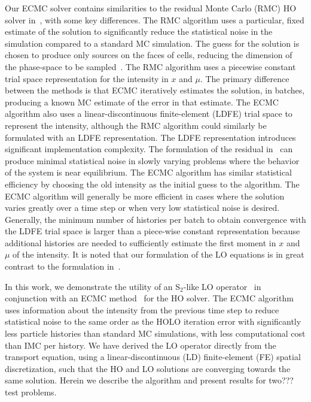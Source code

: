\documentclass{mc2013}
\begin{document}
Our ECMC solver contains similarities to the residual Monte Carlo (RMC) HO solver
in~\cite{rmc}, with some key differences.  The RMC algorithm uses a particular, fixed 
estimate of the solution to significantly reduce the statistical noise in the
simulation compared to a standard MC simulation. The guess for the solution is chosen to produce only sources on the faces of
cells, reducing the dimension of the phase-space to be sampled~\cite{rmc}. The RMC
algorithm  uses a piecewise constant trial space representation for the intensity in
$x$ and $\mu$.
The primary difference between the methods is that ECMC iteratively estimates the
solution, in batches, producing a known MC estimate
of the error in that estimate.  The ECMC algorithm also uses a linear-discontinuous
finite-element (LDFE) trial space to represent the intensity, although the RMC
algorithm could similarly be formulated with an LDFE representation.  The LDFE
representation introduces significant implementation complexity.  The formulation of the residual in~\cite{rmc} can produce minimal
statistical noise in slowly varying problems where the behavior of the system is near
equilibrium. The ECMC algorithm has
similar statistical efficiency by choosing the old intensity as the initial guess to
the algorithm.  The ECMC algorithm will generally be more efficient in cases where
the solution varies greatly over a time step or when very low statistical noise is
desired.  Generally, the minimum number of histories per batch to obtain convergence with the
LDFE trial space is larger than a piece-wise constant representation because additional
histories are needed to sufficiently estimate the first moment in $x$ and $\mu$ of the
intensity. It is noted that our formulation of the LO
equations is in great contrast to the formulation in~\cite{rmc}.

In this work, we demonstrate the utility of an S$_2$-like LO operator~\cite{wolters}
in conjunction with an ECMC method~\cite{jake} for the HO solver.
The ECMC algorithm uses information about the intensity from the previous time step to reduce statistical noise to the same order as
the HOLO iteration error with significantly less particle histories than standard MC
simulations, with less computational cost than IMC per history.  We have derived the LO operator directly from the transport
equation, using a linear-discontinuous (LD) finite-element (FE) spatial
discretization, such that the HO and LO solutions are converging towards the same
solution.
Herein we describe the algorithm and present results for two??? test problems.
\end{document}
